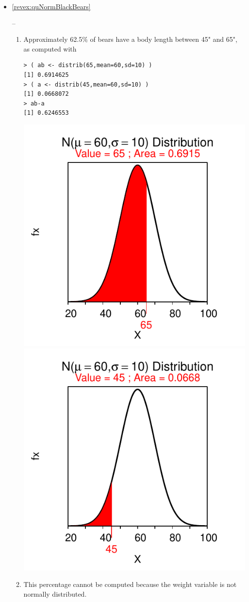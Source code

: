 \documentclass[10pt,openany]{book}\usepackage[]{graphicx}\usepackage[]{color}
\makeatletter
\newenvironment{kframe}{%
 \def\at@end@of@kframe{}%
 \ifinner\ifhmode%
  \def\at@end@of@kframe{\end{minipage}}%
  \begin{minipage}{\columnwidth}%
 \fi\fi%
 \def\FrameCommand##1{\hskip\@totalleftmargin \hskip-\fboxsep
 \colorbox{shadecolor}{##1}\hskip-\fboxsep
     \hskip-\linewidth \hskip-\@totalleftmargin \hskip\columnwidth}%
 \MakeFramed {\advance\hsize-\width
   \@totalleftmargin\z@ \linewidth\hsize
   \@setminipage}}%
 {\par\unskip\endMakeFramed%
 \at@end@of@kframe}
\newenvironment{knitrout}{}{} %
\makeatother
\begin{document}
\begin{itemize}
\begin{enumerate}
\begin{knitrout}
{}



\end{knitrout}
    \end{enumerate}

  \item \hypertarget{ans:quNormBlackBears}{\ref{revex:quNormBlackBears}} --
    \begin{enumerate}
      \item Approximately 62.5\% of bears have a body length between 45" and 65", as computed with
\begin{knitrout}
\color{fgcolor}\begin{kframe}
\begin{verbatim}
> ( ab <- distrib(65,mean=60,sd=10) )
[1] 0.6914625
> ( a <- distrib(45,mean=60,sd=10) )
[1] 0.0668072
> ab-a
[1] 0.6246553
\end{verbatim}
\end{kframe}

{\centering \includegraphics[width=.4\linewidth]{Figs/unnamed-chunk-228-1} 
\includegraphics[width=.4\linewidth]{Figs/unnamed-chunk-228-2} 

}



\end{knitrout}
      \item This percentage cannot be computed because the weight variable is not normally distributed.
    \end{enumerate}


\end{itemize}
\end{document}

